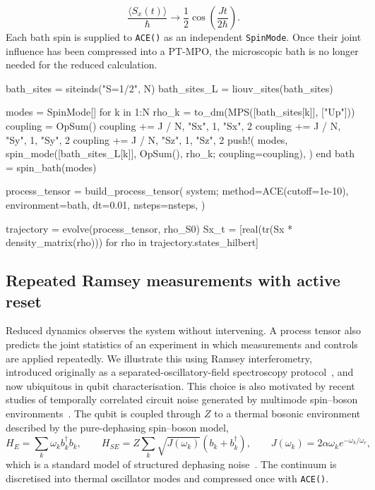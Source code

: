 %
\begin{equation}
    \frac{\langle S_x(t)\rangle}{\hbar}
    \longrightarrow
    \frac{1}{2}\cos\!\left(\frac{Jt}{2\hbar}\right).
    \label{eq:central-spin-limit}
\end{equation}
%
Each bath spin is supplied to \texttt{ACE()} as an independent \texttt{SpinMode}.
Once their joint influence has been compressed into a PT-MPO, the microscopic bath is no longer needed for the reduced calculation. 
%
\begin{juliacode}[
    caption={Independent bath spins assembled into an ACE process tensor.},
    label={lst:workflow-central-spin},
]
bath_sites = siteinds("S=1/2", N)
bath_sites_L = liouv_sites(bath_sites)

modes = SpinMode[]
for k in 1:N
    rho_k = to_dm(MPS([bath_sites[k]], ["Up"]))
    coupling = OpSum()
    coupling += J / N, "Sx", 1, "Sx", 2
    coupling += J / N, "Sy", 1, "Sy", 2
    coupling += J / N, "Sz", 1, "Sz", 2
    push!(
        modes,
        spin_mode([bath_sites_L[k]], OpSum(), rho_k; coupling=coupling),
    )
end
bath = spin_bath(modes)

process_tensor = build_process_tensor(
    system; method=ACE(cutoff=1e-10),
    environment=bath, dt=0.01, nsteps=nsteps,
)

trajectory = evolve(process_tensor, rho_S0)
Sx_t = [real(tr(Sx * density_matrix(rho)))
        for rho in trajectory.states_hilbert]
\end{juliacode}
%

\subsection{Repeated Ramsey measurements with active reset}
\label{subsec:workflow-ramsey}

Reduced dynamics observes the system without intervening. 
A process tensor also predicts the joint statistics of an experiment in which measurements and controls are applied repeatedly. 
We illustrate this using Ramsey interferometry, introduced originally as a separated-oscillatory-field spectroscopy protocol~\cite{Ramsey1950}, and now ubiquitous in qubit characterisation. 
This choice is also motivated by recent studies of temporally correlated circuit noise generated by multimode spin--boson environments~\cite{FigueroaRomero2021RB,Gandhari2026RBSpinBoson}. 
The qubit is coupled through $Z$ to a thermal bosonic environment described by the pure-dephasing spin--boson model,
%
\begin{equation}
    H_E=\sum_k\omega_k b_k^\dagger b_k,
    \qquad
    H_{SE}=Z\sum_k \sqrt{J(\omega_k)}(b_k+b_k^\dagger),
    \qquad
    J(\omega_k)=2\alpha\omega_k e^{-\omega_k/\omega_c},
    \label{eq:ramsey-spin-boson}
\end{equation}
%
which is a standard model of structured dephasing noise~\cite{Leggett1987SpinBoson}. 
The continuum is discretised into thermal oscillator modes and compressed once with \texttt{ACE()}. 

